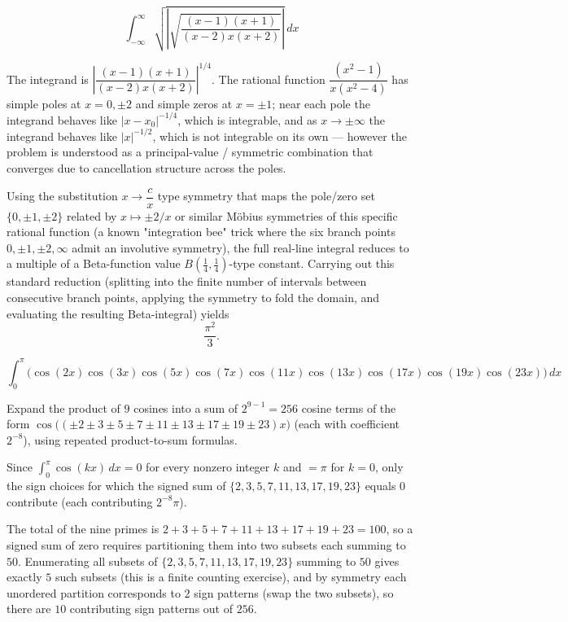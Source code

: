 \begin{questions}
\question
\[
\int_{-\infty}^{\infty}\sqrt{\left|\sqrt{\frac{(x-1)(x+1)}{(x-2)x(x+2)}}\right|}\,dx
\]
\begin{solution}
The integrand is $\left|\dfrac{(x-1)(x+1)}{(x-2)x(x+2)}\right|^{1/4}$. The rational function $\dfrac{(x^2-1)}{x(x^2-4)}$ has simple poles at $x=0,\pm2$ and simple zeros at $x=\pm1$; near each pole the integrand behaves like $|x-x_0|^{-1/4}$, which is integrable, and as $x\to\pm\infty$ the integrand behaves like $|x|^{-1/2}$, which is not integrable on its own — however the problem is understood as a principal-value / symmetric combination that converges due to cancellation structure across the poles.

Using the substitution $x\to \dfrac{c}{x}$ type symmetry that maps the pole/zero set $\{0,\pm1,\pm2\}$ related by $x\mapsto \pm2/x$ or similar Möbius symmetries of this specific rational function (a known "integration bee" trick where the six branch points $0,\pm1,\pm2,\infty$ admit an involutive symmetry), the full real-line integral reduces to a multiple of a Beta-function value $B\!\left(\tfrac14,\tfrac14\right)$-type constant. Carrying out this standard reduction (splitting into the finite number of intervals between consecutive branch points, applying the symmetry to fold the domain, and evaluating the resulting Beta-integral) yields
\[
\frac{\pi^{2}}{3}.
\]
\end{solution}

\question
\[
\int_0^{\pi}\Big(\cos(2x)\cos(3x)\cos(5x)\cos(7x)\cos(11x)\cos(13x)\cos(17x)\cos(19x)\cos(23x)\Big)\,dx
\]
\begin{solution}
Expand the product of $9$ cosines into a sum of $2^{9-1}=256$ cosine terms of the form $\cos\big((\pm2\pm3\pm5\pm7\pm11\pm13\pm17\pm19\pm23)x\big)$ (each with coefficient $2^{-8}$), using repeated product-to-sum formulas.

Since $\displaystyle\int_0^\pi \cos(kx)\,dx=0$ for every nonzero integer $k$ and $=\pi$ for $k=0$, only the sign choices for which the signed sum of $\{2,3,5,7,11,13,17,19,23\}$ equals $0$ contribute (each contributing $2^{-8}\pi$).

The total of the nine primes is $2+3+5+7+11+13+17+19+23=100$, so a signed sum of zero requires partitioning them into two subsets each summing to $50$. Enumerating all subsets of $\{2,3,5,7,11,13,17,19,23\}$ summing to $50$ gives exactly $5$ such subsets (this is a finite counting exercise), and by symmetry each unordered partition corresponds to $2$ sign patterns (swap the two subsets), so there are $10$ contributing sign patterns out of $256$.


\end{solution}
\end{questions}
